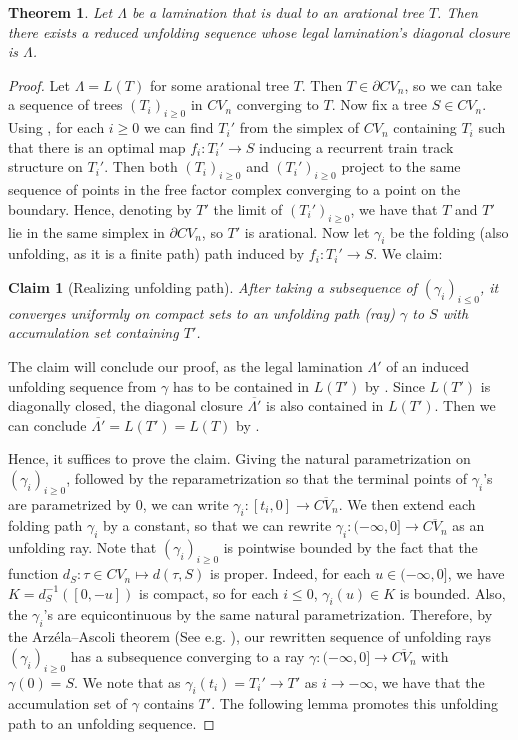 \documentclass[11pt, letterpaper]{amsart}
\theoremstyle{plain}
\newtheorem{theorem}{Theorem}[section]
\newtheorem*{claime}{Claim}
\theoremstyle{definition}
\newcommand{\ov}[1]{\overline{#1}}
\begin{document}
\begin{theorem}\label{thm:arational_limiting_unfolding}
  Let $\Lambda$ be a lamination that is dual to an arational tree $T$.
  Then there exists a reduced unfolding sequence whose legal lamination's diagonal
  closure is $\Lambda$.
\end{theorem}

\begin{proof}
  Let $\Lambda = L(T)$ for some arational tree $T$. Then $T\in \partial CV_n$,
  so we can take a sequence of trees $(T_i)_{i \ge 0}$ in $CV_n$ converging to $T$.
  Now fix a tree $S \in CV_n$. Using , for each $i \ge 0$ we can find
  $T_i'$ from the simplex of $CV_n$ containing $T_i$ such that there is an
  optimal map $f_i : T_i' \to S$ inducing a recurrent train track structure on $T_i'$. Then both $(T_i)_{i \ge
    0}$ and $(T_i')_{i \ge 0}$ project to the same sequence of points in the free factor
  complex converging to a point on the boundary. Hence, denoting by $T'$ the
  limit of $(T_i')_{i \ge 0}$, we have that $T$ and $T'$ lie in the same simplex
  in $\partial CV_n$, so $T'$ is arational. Now let $\gamma_i$ be the
  folding (also unfolding, as it is a finite path)
  path induced by $f_i:T_i' \to S$. We claim:
  \begin{claime}[Realizing  unfolding path]
    After taking a subsequence of $(\gamma_i)_{i \le 0}$, it converges uniformly on compact sets
    to an unfolding path (ray) $\gamma$ to $S$ with accumulation set containing
    $T'$.
  \end{claime}
  The claim will conclude our
  proof, as the legal lamination $\Lambda'$ of an induced unfolding sequence
  from $\gamma$ has to be contained in $L(T')$ by
  .
  Since $L(T')$ is diagonally closed, the
  diagonal closure $\ov{\Lambda'}$ is also contained in $L(T')$. Then we can conclude
  $\ov{\Lambda'} = L(T')=L(T)$ by . 

  Hence, it suffices to prove the claim.
  Giving the natural parametrization on $(\gamma_i)_{i \ge 0}$, followed by the
  reparametrization so that the terminal points of $\gamma_i$'s are parametrized by 0, we can write 
  $\gamma_i:[t_i,0] \to \ov{CV_n}$.
  We then extend each folding path $\gamma_i$ by a constant, so that we can rewrite
  $\gamma_i:(-\infty,0] \to \ov{CV_n}$ as an unfolding ray. Note that $(\gamma_i)_{i \ge 0}$ is
  pointwise bounded by the fact that the function $d_S: \tau\in CV_n \mapsto d(\tau,
  S)$ is proper. Indeed, for each $u \in (-\infty, 0]$, we have
  $K=d_S^{-1}([0,-u])$ is compact, so for each $i \le 0$,  $\gamma_i(u) \in K$
  is bounded. Also, the $\gamma_i$'s are equicontinuous by the same natural
  parametrization. Therefore, by the Arz{\'e}la--Ascoli theorem (See e.g.  \cite{collins2007asymmetric}), our rewritten sequence of unfolding rays 
  $(\gamma_i)_{i \ge 0}$ has a
  subsequence converging to a ray $\gamma:(-\infty, 0] \to \ov{CV_n}$ with $\gamma(0)=S$. We note
  that as $\gamma_i(t_i)=T_i' \to T'$ as $i \to -\infty$, we have that the accumulation
  set of $\gamma$ contains $T'$. The following lemma promotes this
  unfolding path to an unfolding sequence. \end{proof}
\end{document}
